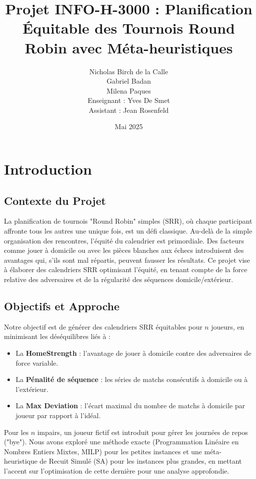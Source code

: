 \documentclass[11pt, a4paper]{article}
\title{Projet INFO-H-3000 : Planification Équitable des Tournois Round Robin avec Méta-heuristiques}
\author{Nicholas Birch de la Calle \\ Gabriel Badan \\ Milena Paques \\[1em] Enseignant : Yves De Smet \\ Assistant : Jean Rosenfeld}
\date{Mai 2025}
\begin{document}
\maketitle
\tableofcontents
\clearpage

\section{Introduction}
\subsection{Contexte du Projet}
La planification de tournois "Round Robin" simples (SRR), où chaque participant affronte tous les autres une unique fois, est un défi classique. Au-delà de la simple organisation des rencontres, l'équité du calendrier est primordiale. Des facteurs comme jouer à domicile ou avec les pièces blanches aux échecs introduisent des avantages qui, s'ils sont mal répartis, peuvent fausser les résultats. Ce projet vise à élaborer des calendriers SRR optimisant l'équité, en tenant compte de la force relative des adversaires et de la régularité des séquences domicile/extérieur.

\subsection{Objectifs et Approche}
Notre objectif est de générer des calendriers SRR équitables pour $n$ joueurs, en minimisant les déséquilibres liés à :
\begin{itemize}
    \item La \textbf{HomeStrength} : l'avantage de jouer à domicile contre des adversaires de force va\-riable.
    \item La \textbf{Pénalité de séquence} : les séries de matchs consécutifs à domicile ou à l'extérieur.
    \item La \textbf{Max Deviation} : l'écart maximal du nombre de matchs à domicile par joueur par rapport à l'idéal.
\end{itemize}
Pour les $n$ impairs, un joueur fictif est introduit pour gérer les journées de repos ("bye").
Nous avons exploré une méthode exacte (Programmation Linéaire en Nombres Entiers Mixtes, MILP) pour les petites instances et une méta-heuristique de Recuit Simulé (SA) pour les instances plus grandes, en mettant l'accent sur l'optimisation de cette dernière pour une analyse approfondie.
\end{document}
